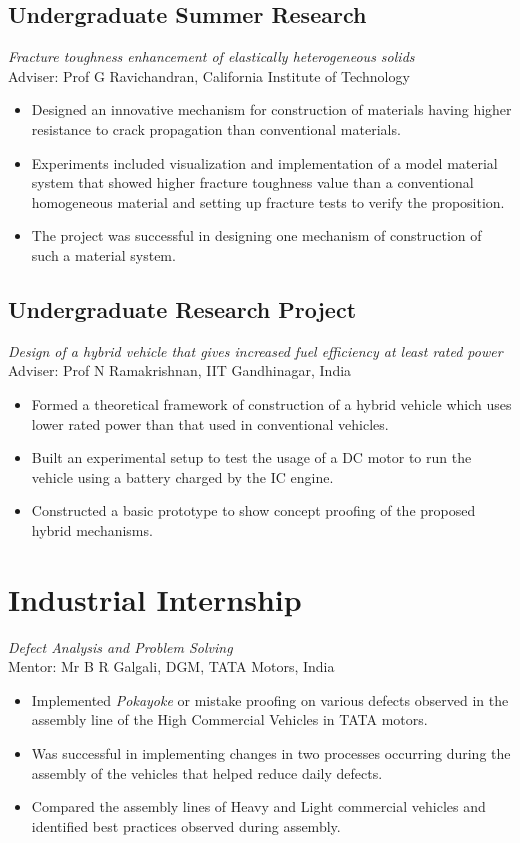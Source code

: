 \documentclass[10pt,fleqn]{article}
\begin{document}
\subsection*{Undergraduate Summer Research}
\emph{Fracture toughness enhancement of elastically heterogeneous solids}\\
 Adviser: Prof G Ravichandran, California Institute of Technology
 \begin{itemize}
\item Designed an innovative mechanism for construction of materials having higher resistance to crack propagation than conventional materials.
\item Experiments included visualization and implementation of a model material system that showed higher fracture toughness value than a conventional homogeneous material and setting up fracture tests to verify the proposition.
\item The project was successful in designing one mechanism of construction of such a material system.
 \end{itemize}
\subsection*{Undergraduate Research Project}
\emph{Design of a hybrid vehicle that gives increased fuel efficiency at least rated power}\\
 Adviser: Prof N Ramakrishnan, IIT Gandhinagar, India
 \begin{itemize}
\item Formed a theoretical framework of construction of a hybrid vehicle which uses lower rated power than that used in conventional vehicles.
\item Built an experimental setup to test the usage of a DC motor to run the vehicle using a battery charged by the IC engine.
\item Constructed a basic prototype to show concept proofing of the proposed hybrid mechanisms.
 \end{itemize}
 
\section*{Industrial Internship} 
\emph{Defect Analysis and Problem Solving}\\
 Mentor: Mr B R Galgali, DGM, TATA Motors, India
 \begin{itemize}
\item Implemented \emph{Pokayoke} or mistake proofing on various defects observed in the assembly line of the High Commercial Vehicles in TATA motors.
\item Was successful in implementing changes in two processes occurring during the assembly of the vehicles that helped reduce daily defects.
\item Compared the assembly lines of Heavy and Light commercial vehicles and identified best practices observed during assembly.  
 \end{itemize}
\end{document}

